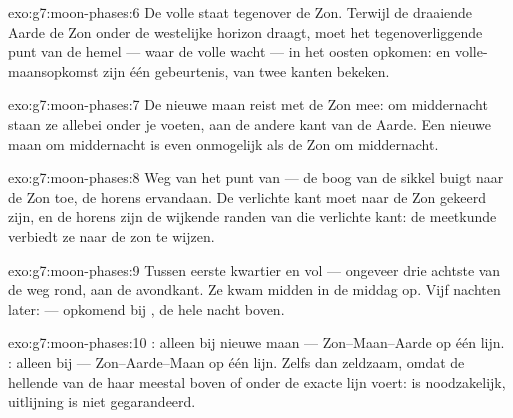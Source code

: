 \begin{solution}{exo:g7:moon-phases:6}
De volle  staat tegenover de Zon. Terwijl de draaiende Aarde de
Zon onder de westelijke horizon draagt, moet het tegenoverliggende punt
van de hemel --- waar de volle  wacht --- in het oosten opkomen:
 en volle-maansopkomst zijn één gebeurtenis, van twee
kanten bekeken.
\end{solution}

\begin{solution}{exo:g7:moon-phases:7}
De nieuwe maan reist met de Zon mee: om middernacht staan ze allebei
onder je voeten, aan de andere kant van de Aarde. Een nieuwe maan om
middernacht is even onmogelijk als de Zon om middernacht.
\end{solution}

\begin{solution}{exo:g7:moon-phases:8}
Weg van het punt van  --- de boog van de sikkel buigt
naar de Zon toe, de horens ervandaan. De verlichte kant moet naar de
Zon gekeerd zijn, en de horens zijn de wijkende randen van die
verlichte kant: de meetkunde verbiedt ze naar de zon te wijzen.
\end{solution}

\begin{solution}{exo:g7:moon-phases:9}
Tussen eerste kwartier en vol --- ongeveer drie achtste van de weg
rond, aan de avondkant. Ze kwam midden in de middag op. Vijf nachten
later:  --- opkomend bij , de hele nacht
boven.
\end{solution}

\begin{solution}{exo:g7:moon-phases:10}
: alleen bij nieuwe maan --- Zon--Maan--Aarde op
één lijn. : alleen bij  --- Zon--Aarde--Maan op één
lijn. Zelfs dan zeldzaam, omdat de hellende  van de
 haar meestal boven of onder de exacte lijn voert:
 is noodzakelijk, uitlijning is niet gegarandeerd.
\end{solution}

